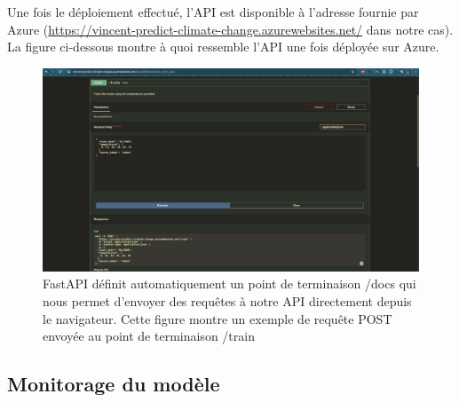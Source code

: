 \documentclass[french]{article}
\begin{document}
    Une fois le déploiement effectué, l'API est disponible à l'adresse fournie par Azure (\href{https://vincent-predict-climate-change.azurewebsites.net/}{https://vincent-predict-climate-change.azurewebsites.net/} dans notre cas). La figure ci-dessous montre à quoi ressemble l'API une fois déployée sur Azure.

    \begin{figure}[h]
        \includegraphics[width=12cm]{api_azure}
        \centering
        \caption{FastAPI définit automatiquement un point de terminaison /docs qui nous permet d'envoyer des requêtes à notre API directement depuis le navigateur. Cette figure montre un exemple de requête POST envoyée au point de terminaison /train}
        \centering
    \end{figure}

    \subsection{Monitorage du modèle}
    
\end{document}
